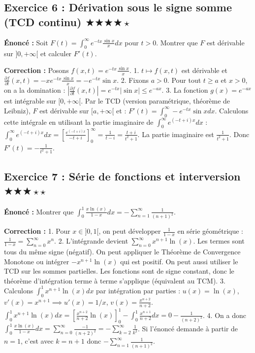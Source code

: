 \documentclass[11pt,a4paper]{article}
\begin{document}
\subsection*{{Exercice 6 : Dérivation sous le signe somme (TCD continu) \quad $\bigstar\bigstar\bigstar\bigstar\star$}}

\textbf{Énoncé :}
Soit $F(t) = \int_0^\infty e^{-tx} \frac{\sin x}{x} dx$ pour $t > 0$.
Montrer que $F$ est dérivable sur $]0, +\infty[$ et calculer $F'(t)$.

\textbf{Correction :}
Posons $f(x, t) = e^{-tx} \frac{\sin x}{x}$.
1. $t \mapsto f(x, t)$ est dérivable et $\frac{\partial f}{\partial t}(x, t) = -x e^{-tx} \frac{\sin x}{x} = -e^{-tx} \sin x$.
2. Fixons $a > 0$. Pour tout $t \ge a$ et $x > 0$, on a la domination :
   $\left| \frac{\partial f}{\partial t}(x, t) \right| = e^{-tx} |\sin x| \le e^{-ax}$.
3. La fonction $g(x) = e^{-ax}$ est intégrable sur $[0, +\infty[$.
Par le TCD (version paramétrique, théorème de Leibniz), $F$ est dérivable sur $[a, +\infty[$ et :
$F'(t) = \int_0^\infty -e^{-tx} \sin x dx$.
Calculons cette intégrale en utilisant la partie imaginaire de $\int_0^\infty e^{(-t+i)x} dx$ :
$\int_0^\infty e^{(-t+i)x} dx = \left[ \frac{e^{(-t+i)x}}{-t+i} \right]_0^\infty = \frac{1}{t-i} = \frac{t+i}{t^2+1}$.
La partie imaginaire est $\frac{1}{t^2+1}$. Donc $F'(t) = -\frac{1}{t^2+1}$.


\subsection*{{Exercice 7 : Série de fonctions et interversion \quad $\bigstar\bigstar\bigstar\star\star$}}

\textbf{Énoncé :}
Montrer que $\int_0^1 \frac{x \ln(x)}{1-x} dx = -\sum_{n=1}^{\infty} \frac{1}{(n+1)^2}$.

\textbf{Correction :}
1. Pour $x \in ]0, 1[$, on peut développer $\frac{1}{1-x}$ en série géométrique : $\frac{1}{1-x} = \sum_{n=0}^{\infty} x^n$.
2. L'intégrande devient $\sum_{n=0}^{\infty} x^{n+1} \ln(x)$. Les termes sont tous du même signe (négatif). On peut appliquer le Théorème de Convergence Monotone ou intégrer $-x^{n+1}\ln(x)$ qui est positif.
On peut aussi utiliser le TCD sur les sommes partielles. Les fonctions sont de signe constant, donc le théorème d'intégration terme à terme s'applique (équivalent au TCM).
3. Calculons $\int_0^1 x^{n+1} \ln(x) dx$ par intégration par parties :
   $u(x) = \ln(x)$, $v'(x) = x^{n+1} \implies u'(x) = 1/x$, $v(x) = \frac{x^{n+2}}{n+2}$.
   $\int_0^1 x^{n+1} \ln(x) dx = \left[ \frac{x^{n+2}}{n+2} \ln(x) \right]_0^1 - \int_0^1 \frac{x^{n+1}}{n+2} dx = 0 - \frac{1}{(n+2)^2}$.
4. On a donc $\int_0^1 \frac{x \ln(x)}{1-x} dx = \sum_{n=0}^{\infty} \frac{-1}{(n+2)^2} = -\sum_{k=2}^{\infty} \frac{1}{k^2}$.
Si l'énoncé demande à partir de $n=1$, c'est avec $k=n+1$ donc $-\sum_{n=1}^{\infty} \frac{1}{(n+1)^2}$.
\end{document}
